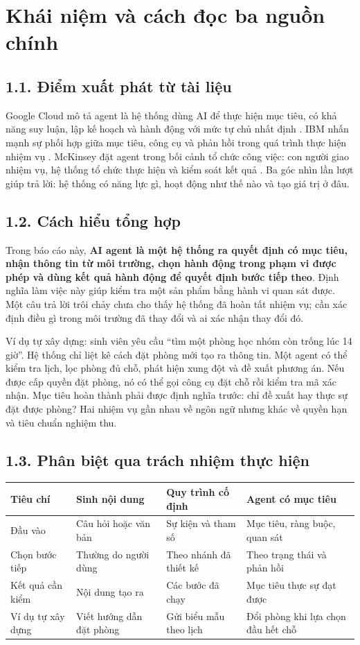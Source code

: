 \documentclass[11pt,a4paper]{article}
\begin{document}
\section{Khái niệm và cách đọc ba nguồn chính}
\subsection{1.1. Điểm xuất phát từ tài liệu}
Google Cloud mô tả agent là hệ thống dùng AI để thực hiện mục tiêu, có khả năng suy luận,
lập kế hoạch và hành động với mức tự chủ nhất định \cite{google}.
IBM nhấn mạnh sự phối hợp giữa mục tiêu, công cụ và phản hồi trong quá trình thực hiện
nhiệm vụ \cite{ibm}. McKinsey đặt agent trong bối cảnh tổ chức công việc: con người giao
nhiệm vụ, hệ thống tổ chức thực hiện và kiểm soát kết quả \cite{mckinsey}.
Ba góc nhìn lần lượt giúp trả lời: hệ thống có năng lực gì, hoạt động như thế nào và tạo
giá trị ở đâu.

\subsection{1.2. Cách hiểu tổng hợp}
Trong báo cáo này, \textbf{AI agent là một hệ thống ra quyết định có mục tiêu, nhận thông tin
từ môi trường, chọn hành động trong phạm vi được phép và dùng kết quả hành động để quyết
định bước tiếp theo}. Định nghĩa làm việc này giúp kiểm tra một sản phẩm bằng hành vi
quan sát được. Một câu trả lời trôi chảy chưa cho thấy hệ thống đã hoàn tất nhiệm vụ;
cần xác định điều gì trong môi trường đã thay đổi và ai xác nhận thay đổi đó.

Ví dụ tự xây dựng: sinh viên yêu cầu ``tìm một phòng học nhóm còn trống lúc 14 giờ''.
Hệ thống chỉ liệt kê cách đặt phòng mới tạo ra thông tin. Một agent có thể kiểm tra lịch,
lọc phòng đủ chỗ, phát hiện xung đột và đề xuất phương án. Nếu được cấp quyền đặt phòng,
nó có thể gọi công cụ đặt chỗ rồi kiểm tra mã xác nhận. Mục tiêu hoàn thành phải được
định nghĩa trước: chỉ đề xuất hay thực sự đặt được phòng? Hai nhiệm vụ gần nhau về ngôn
ngữ nhưng khác về quyền hạn và tiêu chuẩn nghiệm thu.

\subsection{1.3. Phân biệt qua trách nhiệm thực hiện}
\begin{center}\small
\begin{tabularx}{\linewidth}{@{}p{2.8cm}XXX@{}}
\toprule
\textbf{Tiêu chí} & \textbf{Sinh nội dung} & \textbf{Quy trình cố định} & \textbf{Agent có mục tiêu}\\
\midrule
Đầu vào & Câu hỏi hoặc văn bản & Sự kiện và tham số & Mục tiêu, ràng buộc, quan sát\\
Chọn bước tiếp & Thường do người dùng & Theo nhánh đã thiết kế & Theo trạng thái và phản hồi\\
Kết quả cần kiểm & Nội dung tạo ra & Các bước đã chạy & Mục tiêu thực sự đạt được\\
Ví dụ tự xây dựng & Viết hướng dẫn đặt phòng & Gửi biểu mẫu theo lịch & Đổi phòng khi lựa chọn đầu hết chỗ\\
\bottomrule
\end{tabularx}
\end{center}
\end{document}
